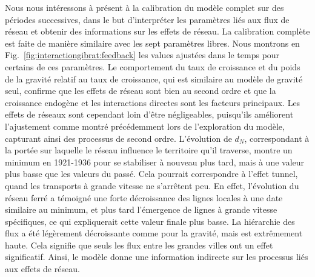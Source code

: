 {Nous nous intéressons à présent à la calibration du modèle complet sur des périodes successives, dans le but d'interpréter les paramètres liés aux flux de réseau et obtenir des informations sur les effets de réseau. La calibration complète est faite de manière similaire avec les sept paramètres libres. Nous montrons en Fig.~\ref{fig:interactiongibrat:feedback} les values ajustées dans le temps pour certains de ces paramètres. Le comportement du taux de croissance et du poids de la gravité relatif au taux de croissance, qui est similaire au modèle de gravité seul, confirme que les effets de réseau sont bien au second ordre et que la croissance endogène et les interactions directes sont les facteurs principaux. Les effets de réseaux sont cependant loin d'être négligeables, puisqu'ils améliorent l'ajustement comme montré précédemment lors de l'exploration du modèle, capturant ainsi des processus de second ordre. L'évolution de $d_N$, correspondant à la portée sur laquelle le réseau influence le territoire qu'il traverse, montre un minimum en 1921-1936 pour se stabiliser à nouveau plus tard, mais à une valeur plus basse que les valeurs du passé. Cela pourrait correspondre à l'effet tunnel, quand les transports à grande vitesse ne s'arrêtent peu. En effet, l'évolution du réseau ferré a témoigné une forte décroissance des lignes locales à une date similaire au minimum, et plus tard l'émergence de lignes à grande vitesse spécifiques, ce qui expliquerait cette valeur finale plus basse. La hiérarchie des flux a été légèrement décroissante comme pour la gravité, mais est extrêmement haute. Cela signifie que seuls les flux entre les grandes villes ont un effet significatif. Ainsi, le modèle donne une information indirecte sur les processus liés aux effets de réseau.
}



